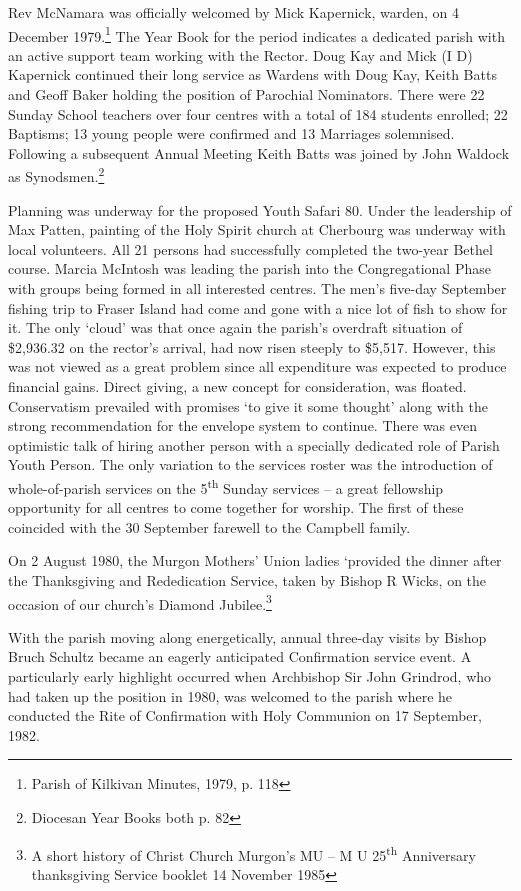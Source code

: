 Rev McNamara was officially welcomed by Mick Kapernick, warden, on 4 December 1979.\footnote{Parish of Kilkivan Minutes, 1979, p. 118} The Year Book for the period indicates a dedicated parish with an active support team working with the Rector. Doug Kay and Mick (I D) Kapernick continued their long service as Wardens with Doug Kay, Keith Batts and Geoff Baker holding the position of Parochial Nominators. There were 22 Sunday School teachers over four centres with a total of 184 students enrolled; 22 Baptisms; 13 young people were confirmed and 13 Marriages solemnised. Following a subsequent Annual Meeting Keith Batts was joined by John Waldock as Synodsmen.\footnote{Diocesan Year Books both p. 82}

Planning was underway for the proposed Youth Safari 80. Under the leadership of Max Patten, painting of the Holy Spirit church at Cherbourg was underway with local volunteers. All 21 persons had successfully completed the two-year Bethel course. Marcia McIntosh was leading the parish into the Congregational Phase with groups being formed in all interested centres. The men's five-day September fishing trip to Fraser Island had come and gone with a nice lot of fish to show for it. The only `cloud' was that once again the parish's overdraft situation of \$2,936.32 on the rector's arrival, had now risen steeply to \$5,517. However, this was not viewed as a great problem since all expenditure was expected to produce financial gains. Direct giving, a new concept for consideration, was floated. Conservatism prevailed with promises `to give it some thought' along with the strong recommendation for the envelope system to continue. There was even optimistic talk of hiring another person with a specially dedicated role of Parish Youth Person. The only variation to the services roster was the introduction of whole-of-parish services on the 5\textsuperscript{th} Sunday services -- a great fellowship opportunity for all centres to come together for worship. The first of these coincided with the 30 September farewell to the Campbell family.

On 2 August 1980, the Murgon Mothers' Union ladies `provided the dinner after the Thanksgiving and Rededication Service, taken by Bishop R Wicks, on the occasion of our church's Diamond Jubilee.\footnote{A short history of Christ Church Murgon's MU -- M U 25\textsuperscript{th} Anniversary thanksgiving Service booklet 14 November 1985}

With the parish moving along energetically, annual three-day visits by Bishop Bruch Schultz became an eagerly anticipated Confirmation service event. A particularly early highlight occurred when Archbishop Sir John Grindrod, who had taken up the position in 1980, was welcomed to the parish where he conducted the Rite of Confirmation with Holy Communion on 17 September, 1982.

